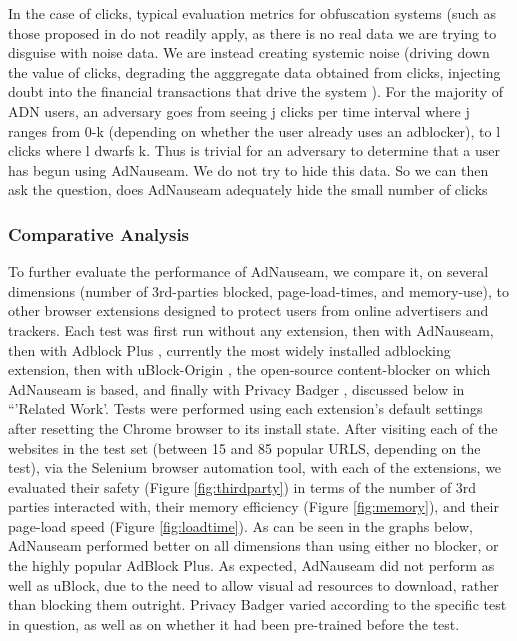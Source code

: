 \documentclass[conference]{IEEEtran}
\begin{document}
In the case of clicks, typical evaluation metrics for obfuscation systems (such as those proposed in \cite{Peddinti} do not readily apply, as there is no real data we are trying to disguise with noise data. We are instead creating systemic noise (driving down the value of clicks, degrading the agggregate data obtained from clicks, injecting doubt into the financial transactions that drive the system ). For the majority of ADN users, an adversary goes from seeing j clicks per time interval where j ranges from 0-k (depending on whether the user already uses an adblocker), to l clicks where l dwarfs k. Thus is trivial for an adversary to determine that a user has begun using AdNauseam. We do not try to hide this data. So we can then ask the question, does AdNauseam adequately hide the small number of clicks

%

\subsubsection{Comparative Analysis}

To further evaluate the performance of AdNauseam, we compare it, on several dimensions (number of 3rd-parties blocked, page-load-times, and memory-use), to other browser extensions designed to protect users from online advertisers and trackers. Each test was first run without any extension, then with AdNauseam, then with Adblock Plus \cite{AdBlock}, currently the most widely installed adblocking extension, then with uBlock-Origin \cite{Gorhill}, the open-source content-blocker on which AdNauseam is based, and finally with Privacy Badger \cite{EFF}, discussed below in “'Related Work'. Tests were performed using each extension's default settings after resetting the Chrome browser to its install state. After visiting each of the websites in the test set (between 15 and 85 popular URLS, depending on the test), via the Selenium browser automation tool, with each of the extensions, we evaluated their safety (Figure \ref{fig:thirdparty}) in terms of the number of 3rd parties interacted with, their memory efficiency (Figure \ref{fig:memory}), and their page-load speed (Figure \ref{fig:loadtime}). As can be seen in the graphs below, AdNauseam performed better on all dimensions than using either no blocker, or the highly popular AdBlock Plus. As expected, AdNauseam did not perform as well as uBlock, due to the need to allow visual ad resources to download, rather than blocking them outright. Privacy Badger varied according to the specific test in question, as well as on whether it had been pre-trained before the test.
\end{document}
